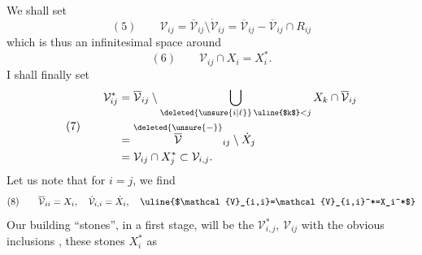 We shall set 
\[
(5)\qquad \mathcal{V}_{ij}=\overline{\mathcal{V}}_{ij}\setminus\dot{\mathcal{V}}_{ij}=\overline{\mathcal{V}}_{ij}-\overline{\mathcal{V}}_{ij}\cap R_{ij}
\]
which is thus an infinitesimal space around
\[
(6)\qquad \mathcal{V}_{ij}\cap X_i=X_i^*.
\]
I shall finally set
\[
(7)\qquad\begin{aligned}
\mathcal{V}_{ij}^*&=\overline{\mathcal{V}}_{ij}\setminus\bigcup_{\deleted{\unsure{i|\ell}}\,\text{\uline{$k$}}<j}X_k\cap\overline{\mathcal{V}}_{ij}\\
&=\overset{\deleted{\unsure{-}}}{\overline{\mathcal{V}}}_{ij}\setminus\dot X_j\\
&=\mathcal{V}_{ij}\cap X_j^*\subset\mathcal{V}_{i,j}.
\end{aligned}
\]
Let us note that for $i=j$, we find
\[
(8)\qquad\overline{\mathcal{V}}_{ii}=X_i,\quad\dot{\mathcal{V}}_{i,i}=\dot X_i,\quad\text{\uline{$\mathcal{V}_{i,i}=\mathcal{V}_{i,i}^*=X_i^*$}}
\]
Our building ``stones'', in a first stage, will be the $\mathcal{V}_{i,j}^*$, $\mathcal{V}_{ij}$ with the obvious inclusions
,
these stones   $X_i^*$ as
